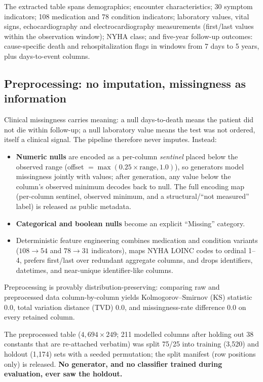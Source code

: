 \documentclass[11pt,a4paper]{article}
\begin{document}
The extracted table spans demographics; encounter characteristics; 30 symptom
indicators; 108 medication and 78 condition indicators; laboratory values, vital
signs, echocardiography and electrocardiography measurements (first/last values
within the observation window); NYHA class; and five-year follow-up outcomes:
cause-specific death and rehospitalization flags in windows from 7 days to 5 years,
plus days-to-event columns.

\subsection{Preprocessing: no imputation, missingness as information}

Clinical missingness carries meaning: a null days-to-death means the patient did not
die within follow-up; a null laboratory value means the test was not ordered, itself
a clinical signal. The pipeline therefore never imputes. Instead:

\begin{itemize}
\item \textbf{Numeric nulls} are encoded as a per-column \emph{sentinel} placed below
the observed range (offset $= \max(0.25 \times \text{range}, 1.0)$), so generators
model missingness jointly with values; after generation, any value below the
column's observed minimum decodes back to null. The full encoding map (per-column
sentinel, observed minimum, and a structural/``not measured'' label) is released as
public metadata.
\item \textbf{Categorical and boolean nulls} become an explicit ``Missing'' category.
\item Deterministic feature engineering combines medication and condition variants
($108 \to 54$ and $78 \to 31$ indicators), maps NYHA LOINC codes to ordinal 1--4,
prefers first/last over redundant aggregate columns, and drops identifiers,
datetimes, and near-unique identifier-like columns.
\end{itemize}

Preprocessing is provably distribution-preserving: comparing raw and preprocessed
data column-by-column yields Kolmogorov--Smirnov (KS) statistic 0.0, total variation
distance (TVD) 0.0, and missingness-rate difference 0.0 on every retained column.

The preprocessed table ($4{,}694 \times 249$; 211 modelled columns after holding out
38 constants that are re-attached verbatim) was split 75/25 into training (3{,}520)
and holdout (1{,}174) sets with a seeded permutation; the split manifest (row
positions only) is released. \textbf{No generator, and no classifier trained during
evaluation, ever saw the holdout.}
\end{document}
